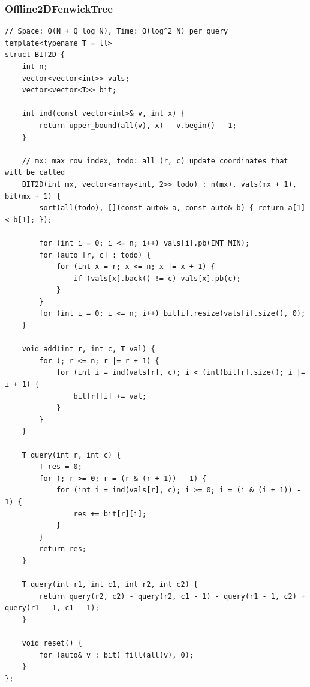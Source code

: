 \documentclass[9pt,a4paper,twocolumn]{extarticle}
\begin{document}
\subsubsection{Offline2DFenwickTree}
\nopagebreak
\begin{lstlisting}
// Space: O(N + Q log N), Time: O(log^2 N) per query
template<typename T = ll>
struct BIT2D {
    int n;
    vector<vector<int>> vals;
    vector<vector<T>> bit;

    int ind(const vector<int>& v, int x) {
        return upper_bound(all(v), x) - v.begin() - 1;
    }

    // mx: max row index, todo: all (r, c) update coordinates that will be called
    BIT2D(int mx, vector<array<int, 2>> todo) : n(mx), vals(mx + 1), bit(mx + 1) {
        sort(all(todo), [](const auto& a, const auto& b) { return a[1] < b[1]; });

        for (int i = 0; i <= n; i++) vals[i].pb(INT_MIN);
        for (auto [r, c] : todo) {
            for (int x = r; x <= n; x |= x + 1) {
                if (vals[x].back() != c) vals[x].pb(c);
            }
        }
        for (int i = 0; i <= n; i++) bit[i].resize(vals[i].size(), 0);
    }

    void add(int r, int c, T val) {
        for (; r <= n; r |= r + 1) {
            for (int i = ind(vals[r], c); i < (int)bit[r].size(); i |= i + 1) {
                bit[r][i] += val;
            }
        }
    }

    T query(int r, int c) {
        T res = 0;
        for (; r >= 0; r = (r & (r + 1)) - 1) {
            for (int i = ind(vals[r], c); i >= 0; i = (i & (i + 1)) - 1) {
                res += bit[r][i];
            }
        }
        return res;
    }

    T query(int r1, int c1, int r2, int c2) {
        return query(r2, c2) - query(r2, c1 - 1) - query(r1 - 1, c2) + query(r1 - 1, c1 - 1);
    }

    void reset() {
        for (auto& v : bit) fill(all(v), 0);
    }
};
\end{lstlisting}

\filbreak
\end{document}
